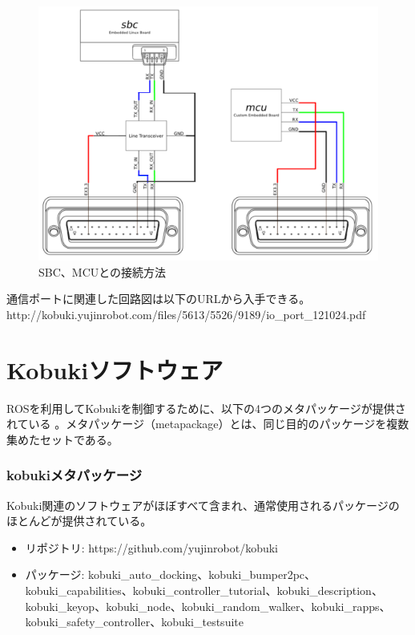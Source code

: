 \begin{figure}[ht]
  \centering
  \includegraphics[width=\columnwidth]{pictures/chapter9/pic_09_10.png}
  \caption{SBC、MCUとの接続方法}
\end{figure}

\begin{exercise}[通信ポート関連回路図の入手先]
通信ポートに関連した回路図は以下のURLから入手できる。
http://kobuki.yujinrobot.com/files/5613/5526/9189/io\_port\_121024.pdf
\end{exercise}

\section{Kobukiソフトウェア}

ROSを利用してKobukiを制御するために、以下の4つのメタパッケージが提供されている  。メタパッケージ（metapackage）とは、同じ目的のパッケージを複数集めたセットである。

\subsubsection{kobukiメタパッケージ}

Kobuki関連のソフトウェアがほぼすべて含まれ、通常使用されるパッケージのほとんどが提供されている。

\begin{itemize}
\item リポジトリ: https://github.com/yujinrobot/kobuki
\item パッケージ: kobuki\_auto\_docking、kobuki\_bumper2pc、kobuki\_capabilities、kobuki\_controller\_tutorial、kobuki\_description、kobuki\_keyop、kobuki\_node、kobuki\_random\_walker、kobuki\_rapps、kobuki\_safety\_controller、kobuki\_testsuite
\end{itemize}

